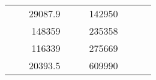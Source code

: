 \begin{table}[H]
\begin{tabular}{|ccrccrccc}
\multicolumn{1}{|c|}{\cellcolor[HTML]{FFFFC7}}                                & \multicolumn{1}{c|}{\cellcolor[HTML]{DDFDFF}}                      & \multicolumn{1}{r|}{\cellcolor[HTML]{DAE8FC}29087.9}   & \multicolumn{1}{c|}{\cellcolor[HTML]{FFFFC7}}                                & \multicolumn{1}{c|}{\cellcolor[HTML]{DDFDFF}}                       & \multicolumn{1}{r|}{\cellcolor[HTML]{DDFDFF}142950}    &                                                                              &                                                                    &                                                        \\ \cline{3-3} \cline{6-6}
\multicolumn{1}{|c|}{\cellcolor[HTML]{FFFFC7}}                                & \multicolumn{1}{c|}{\cellcolor[HTML]{DDFDFF}}                      & \multicolumn{1}{r|}{\cellcolor[HTML]{DDFDFF}148359}    & \multicolumn{1}{c|}{\cellcolor[HTML]{FFFFC7}}                                & \multicolumn{1}{c|}{\cellcolor[HTML]{DDFDFF}}                       & \multicolumn{1}{r|}{\cellcolor[HTML]{DAE8FC}235358}    &                                                                              &                                                                    &                                                        \\ \cline{3-3} \cline{6-6}
\multicolumn{1}{|c|}{\cellcolor[HTML]{FFFFC7}}                                & \multicolumn{1}{c|}{\cellcolor[HTML]{DDFDFF}}                      & \multicolumn{1}{r|}{\cellcolor[HTML]{DAE8FC}116339}    & \multicolumn{1}{c|}{\cellcolor[HTML]{FFFFC7}}                                & \multicolumn{1}{c|}{\cellcolor[HTML]{DDFDFF}}                       & \multicolumn{1}{r|}{\cellcolor[HTML]{DDFDFF}275669}    &                                                                              &                                                                    &                                                        \\ \cline{3-3} \cline{6-6}
\multicolumn{1}{|c|}{\cellcolor[HTML]{FFFFC7}}                                & \multicolumn{1}{c|}{\cellcolor[HTML]{DDFDFF}}                      & \multicolumn{1}{r|}{\cellcolor[HTML]{DDFDFF}20393.5}   & \multicolumn{1}{c|}{\cellcolor[HTML]{FFFFC7}}                                & \multicolumn{1}{c|}{\cellcolor[HTML]{DDFDFF}}                       & \multicolumn{1}{r|}{\cellcolor[HTML]{DAE8FC}609990}    &                                                                              &                                                                    &                                                        \\ \cline{3-3} \cline{6-6}

\end{tabular}
\end{table}
